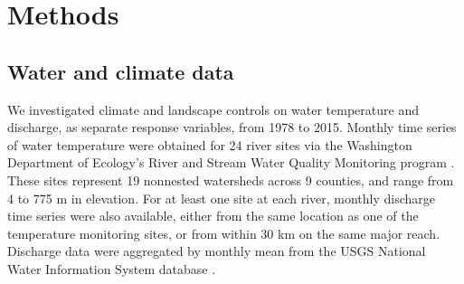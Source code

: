 \documentclass[notitlepage]{article}
\begin{document}
\section*{Methods}




\subsection*{Water and climate data}

We investigated climate and landscape controls on water temperature and discharge, as separate response variables, from 1978 to 2015. Monthly time series of water temperature were obtained for 24 river sites via the Washington Department of Ecology's River and Stream Water Quality Monitoring program \citep{DoEwaterData}. These sites represent 19 nonnested watersheds across 9 counties, and range from 4 to 775 m in elevation. For at least one site at each river, monthly discharge time series were also available, either from the same location as one of the temperature monitoring sites, or from within 30 km on the same major reach. Discharge data were aggregated by monthly mean from the USGS National Water Information System database \citep{USGSdischarge}.
\end{document}
